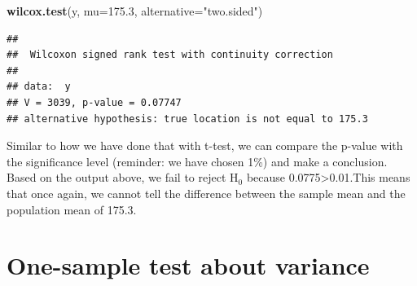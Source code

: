 \documentclass[
]{book}
\newenvironment{Shaded}{\begin{snugshade}}{\end{snugshade}}
\newcommand{\AttributeTok}[1]{\textcolor[rgb]{0.13,0.29,0.53}{#1}}
\newcommand{\FloatTok}[1]{\textcolor[rgb]{0.00,0.00,0.81}{#1}}
\newcommand{\FunctionTok}[1]{\textcolor[rgb]{0.13,0.29,0.53}{\textbf{#1}}}
\newcommand{\NormalTok}[1]{#1}
\newcommand{\StringTok}[1]{\textcolor[rgb]{0.31,0.60,0.02}{#1}}
\theoremstyle{definition}
\theoremstyle{definition}
\theoremstyle{definition}
\theoremstyle{definition}
\theoremstyle{remark}
\begin{document}
\begin{Shaded}
\begin{Highlighting}[]
\FunctionTok{wilcox.test}\NormalTok{(y, }\AttributeTok{mu=}\FloatTok{175.3}\NormalTok{, }\AttributeTok{alternative=}\StringTok{"two.sided"}\NormalTok{)}
\end{Highlighting}
\end{Shaded}

\begin{verbatim}
## 
##  Wilcoxon signed rank test with continuity correction
## 
## data:  y
## V = 3039, p-value = 0.07747
## alternative hypothesis: true location is not equal to 175.3
\end{verbatim}

Similar to how we have done that with t-test, we can compare the p-value with the significance level (reminder: we have chosen 1\%) and make a conclusion. Based on the output above, we fail to reject H\(_0\) because 0.0775\textgreater0.01.This means that once again, we cannot tell the difference between the sample mean and the population mean of 175.3.

\section{One-sample test about variance}\label{statisticalTestsOneSampleVariance}
\end{document}

